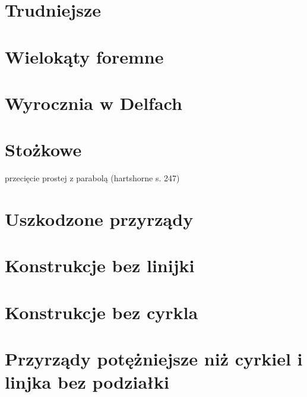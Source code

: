 

\section{Trudniejsze}


\section{Wielokąty foremne}


\section{Wyrocznia w Delfach}


\section{Stożkowe}
przecięcie prostej z parabolą (hartshorne s. 247)


\section{Uszkodzone przyrządy}


\section{Konstrukcje bez linijki}



\section{Konstrukcje bez cyrkla}




\section{Przyrządy potężniejsze niż cyrkiel i linjka bez podziałki}



